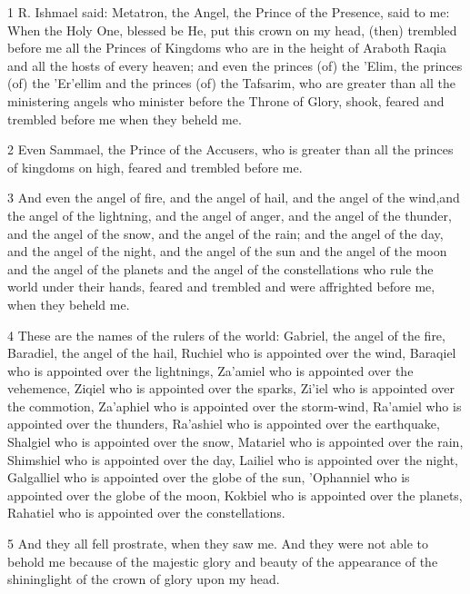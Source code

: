 \par 1 R. Ishmael said: Metatron, the Angel, the Prince of the Presence, said to me: When the Holy One, blessed be He, put this crown on my head, (then) trembled before me all the Princes of Kingdoms who are in the height of Araboth Raqia and all the hosts of every heaven; and even the princes (of) the 'Elim, the princes (of) the 'Er'ellim and the princes (of) the Tafsarim, who are greater than all the ministering angels who minister before the Throne of Glory, shook, feared and trembled before me when they beheld me. 

\par 2 Even Sammael, the Prince of the Accusers, who is greater than all the princes of kingdoms on high, feared and trembled before me. 

\par 3 And even the angel of fire, and the angel of hail, and the angel of the wind,and the angel of the lightning, and the angel of anger, and the angel of the thunder, and the angel of the snow, and the angel of the rain; and the angel of the day, and the angel of the night, and the angel of the sun and the angel of the moon and the angel of the planets and the angel of the constellations who rule the world under their hands, feared and trembled and were affrighted before me, when they beheld me. 

\par 4 These are the names of the rulers of the world: Gabriel, the angel of the fire, Baradiel, the angel of the hail, Ruchiel who is appointed over the wind, Baraqiel who is appointed over the lightnings, Za'amiel who is appointed over the vehemence, Ziqiel who is appointed over the sparks, Zi'iel who is appointed over the commotion, Za'aphiel who is appointed over the storm-wind, Ra'amiel who is appointed over the thunders, Ra'ashiel who is appointed over the earthquake, Shalgiel who is appointed over the snow, Matariel who is appointed over the rain, Shimshiel who is appointed over the day, Lailiel who is appointed over the night, Galgalliel who is appointed over the globe of the sun, 'Ophanniel who is appointed over the globe of the moon, Kokbiel who is appointed over the planets, Rahatiel who is appointed over the constellations. 

\par 5 And they all fell prostrate, when they saw me. And they were not able to behold me because of the majestic glory and beauty of the appearance of the shininglight of the crown of glory upon my head.

